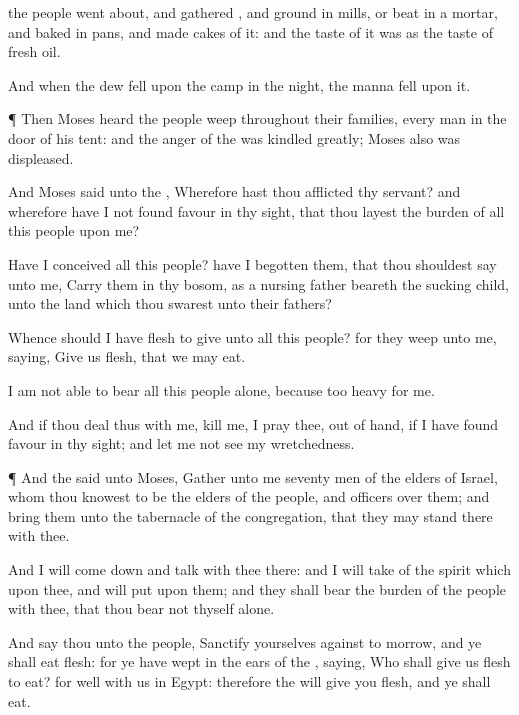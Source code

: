 { the
people went
about, and
gathered
{}, and
ground
{} in
mills, or
beat
{} in a
mortar, and
baked
{} in
pans, and
made
cakes of it: and the
taste of it was as the
taste of
fresh
oil.

And when the
dew
fell upon the
camp in the
night, the
manna
fell upon it.


\par }{\PP {}¶ Then
Moses
heard the
people
weep throughout their
families, every
man in the
door of his
tent: and the
anger of the
{} was
kindled
greatly;
Moses also was
displeased.

And
Moses
said unto the
{}, Wherefore hast thou
afflicted thy
servant? and wherefore have I not
found
favour in thy
sight, that thou
layest the
burden of all this
people upon me?

Have I
conceived all this
people? have I
begotten them, that thou shouldest
say unto me,
Carry them in thy
bosom, as a nursing
father
beareth the sucking
child, unto the
land which thou
swarest unto their
fathers?

Whence should I have
flesh to
give unto all this
people? for they
weep unto me,
saying,
Give us
flesh, that we may
eat.

I am not
able to
bear all this
people
alone, because
{} too
heavy for me.

And if thou
deal thus with me,
kill me, I pray thee, out of
hand, if I have
found
favour in thy
sight; and let me not
see my
wretchedness.


\par }{\PP {}¶ And the
{}
said unto
Moses,
Gather unto me
seventy
men of the
elders of
Israel, whom thou
knowest to be the
elders of the
people, and
officers over them; and
bring them unto the
tabernacle of the
congregation, that they may
stand there with thee.

And I will come
down and
talk with thee there: and I will
take of the
spirit which
{} upon thee, and will
put
{} upon them; and they shall
bear the
burden of the
people with thee, that thou
bear
{} not thyself alone.

And
say thou unto the
people,
Sanctify yourselves against to
morrow, and ye shall
eat
flesh: for ye have
wept in the
ears of the
{},
saying, Who shall give us
flesh to
eat? for
{}
well with us in
Egypt: therefore the
{} will
give you
flesh, and ye shall
eat.

}
